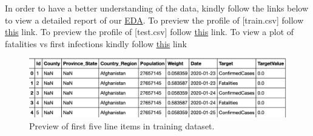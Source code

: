 \documentclass{article}
\begin{document}
 In order to have a better understanding of the data, kindly follow the links below to view a detailed report of our \href{https://acquayefrank.github.io/MLDM2020-Project/}{EDA}. To preview the profile of [train.csv] follow \href{https://acquayefrank.github.io/MLDM2020-Project/output_train.html}{this} link. To preview the profile of [test.csv] follow \href{ https://acquayefrank.github.io/MLDM2020-Project/output_test.html}{this} link. To view a plot of fatalities vs first infections kindly follow \href{https://acquayefrank.github.io/MLDM2020-Project/firstinfect_and_fatal.html}{this} link
 

 
 
\begin{figure}
  \centering
  \includegraphics[width=\columnwidth]{train_head.png}
  \caption{Preview of first five line items in training dataset.}
\end{figure}
\end{document}
